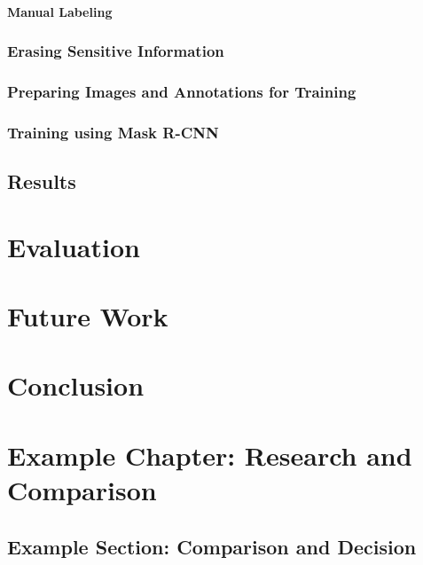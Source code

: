 \subsubsection{Manual Labeling}
\subsection{Erasing Sensitive Information}
\subsection{Preparing Images and Annotations for Training}
\subsection{Training using Mask R-CNN}

\section{Results}

\chapter{Evaluation}
\label{ch:evaluation}

\chapter{Future Work}
\label{ch:future-work}

\chapter{Conclusion}
\label{ch:conclusion}

\chapter{Example Chapter: Research and Comparison}

\section{Example Section: Comparison and Decision}
\label{sec:comparison}

